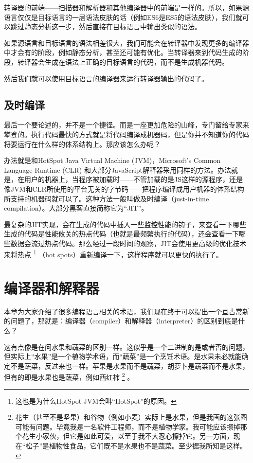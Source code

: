\documentclass[cn,10pt,math=newtx,citestyle=gb7714-2015,bibstyle=gb7714-2015]{elegantbook}
\begin{document}
转译器的前端——扫描器和解析器和其他编译器中的前端是一样的。所以，如果源语言仅仅是目标语言的一层语法皮肤的话（例如ES6是ES5的语法皮肤），我们就可以跳过静态分析这一步，然后直接在目标语言中输出类似的语法。

如果源语言和目标语言的语法相差很大，我们可能会在转译器中发现更多的编译器中才会有的阶段，例如静态分析，甚至还可能有优化。当转译器来到代码生成的阶段，转译器会生成在语法上正确的目标语言的代码，而不是生成机器代码。

然后我们就可以使用目标语言的编译器来运行转译器输出的代码了。

\subsection{及时编译}

最后一个要论述的，并不是一个捷径。而是一座更加危险的山峰，专门留给专家来攀登的。执行代码最快的方式就是将代码编译成机器码，但是你并不知道你的代码将要运行在什么样的体系结构上。那应该怎么办呢？

办法就是和HotSpot Java Virtual Machine (JVM)，Microsoft’s Common Language Runtime (CLR) 和大部分JavaScript解释器采用同样的方法。办法就是，在用户的机器上，当程序被加载时——不管加载的是JS这样的源程序，还是像JVM和CLR所使用的平台无关的字节码——把程序编译成用户机器的体系结构所支持的机器码就可以了。这种方法一般叫做及时编译（just-in-time compilation）。大部分黑客直接简称它为“JIT”。

最复杂的JIT实现，会在生成的代码中插入一些监控性能的钩子，来查看一下哪些生成的代码是性能攸关的热点代码（也就是最频繁执行的代码），还会查看一下哪些数据会流过热点代码。那么经过一段时间的观察，JIT会使用更高级的优化技术来将热点 \footnote{这也是为什么HotSpot JVM会叫“HotSpot”的原因。} （hot spots）重新编译一下，这样程序就可以更快的执行了。

\section{编译器和解释器}

本章为大家介绍了很多编程语言相关的术语，我们现在终于可以提出一个亘古常新的问题了，那就是：编译器（compiler）和解释器（interpreter）的区别到底是什么？

这有点像是在问水果和蔬菜的区别一样。这似乎是一个二进制的是或者否的问题，但实际上“水果”是一个植物学术语，而“蔬菜”是一个烹饪术语。是水果未必就能确定不是蔬菜，反过来也一样。苹果是水果而不是蔬菜，胡萝卜是蔬菜而不是水果，但有的即是水果也是蔬菜，例如西红柿 \footnote{花生（甚至不是坚果）和谷物（例如小麦）实际上是水果，但是我画的这张图可能有问题。毕竟我是一名软件工程师，而不是植物学家。我可能应该擦掉那个花生小家伙，但它是如此可爱，以至于我不大忍心擦掉它。另一方面，现在“松子”是植物性食品，它们既不是水果也不是蔬菜。至少据我所知是这样。} 。
\end{document}
